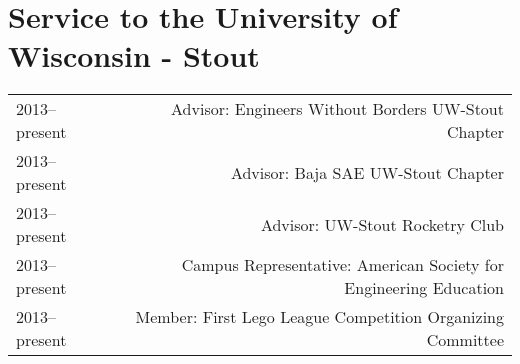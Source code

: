 \section*{Service to the University of Wisconsin - Stout}
\begin{tabular}{L!{\VRule}R}
2013--present&Advisor: Engineers Without Borders UW-Stout Chapter \\
2013--present&Advisor: Baja SAE UW-Stout Chapter \\
2013--present&Advisor: UW-Stout Rocketry Club\\
2013--present&Campus Representative: American Society for Engineering Education\\
2013--present&Member: First Lego League Competition Organizing Committee\\
\end{tabular}